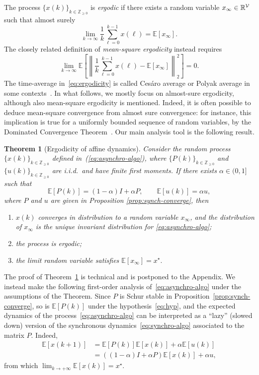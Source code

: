 \documentclass{IEEEtran}
\newtheorem{theorem}{Theorem}
\newcommand{\real}{\mathbb{R}}
\newcommand{\integernonnegative}{\mathbb{Z}_{\ge 0}}
\def\Exp{\mathbb{E}}
\newcommand{\1}{\mathbf{1}} \newcommand{\ind}{\mathds{1}}
\begin{document}
The process $\{x(k)\}_{k\in\integernonnegative}$ is {\em ergodic} if there exists a random variable $x_{\infty} \in \real^\V $ such that almost surely
\begin{equation}\label{eq:ergodicity}
\lim_{k\to \infty}\frac{1}{k}\sum_{\ell=0}^{k-1}x({\ell})=\Exp[x_{\infty}].
\end{equation} 
The closely related definition of {\em{mean-square ergodicity}} instead requires  $$
\lim_{k\to \infty}\Exp\left[\left\|\frac{1}{k}\sum_{\ell=0}^{k-1}x({\ell})-\Exp[x_{\infty}]
\right\|_2^2\right]=0.
$$
The time-average in~\eqref{eq:ergodicity} is called Ces\'aro average or Polyak average in some contexts~\cite{BTP-ABJ:92}.
In what follows, we mostly focus on almost-sure ergodicity, although also mean-square ergodicity is mentioned. Indeed, it is often possible to deduce mean-square convergence from almost sure convergence: for instance, this implication is true for a uniformly bounded sequence of random variables, by the Dominated Convergence Theorem~\cite{VB:95}.
Our main analysis tool is the following result.

\begin{theorem}[Ergodicity of affine dynamics]
\label{thm:ergodic}
Consider the random process $\{x(k)\}_{k\in\integernonnegative}$ defined in~(\ref{eq:asynchro-algo}), where $\{P(k)\}_{k\in\integernonnegative}$ and $\{u(k)\}_{k\in\integernonnegative}$ are i.i.d.\ and have finite first moments. If there exists $\alpha\in(0,1]$ such that 
\begin{equation}\label{eq:hyp}\Exp[P(k)]=(1-\alpha)I+\alpha P,\qquad\Exp[u(k)]=\alpha u,\end{equation} where $P$ and $u$ are given in Proposition \ref{prop:synch-converge}, then
\begin{enumerate}
\item $x(k)$ converges in distribution to a random variable $x_{\infty}$, and the distribution of $x_{\infty}$ is the unique invariant distribution for \eqref{eq:asynchro-algo};
\item the process is {\em ergodic};
\item the limit random variable satisfies
$
\Exp[x_\infty]=x^{\star}.
$ 
\end{enumerate}
\end{theorem}
The proof of Theorem~\ref{thm:ergodic} is technical and is postponed to the Appendix. We instead make the following first-order analysis of~\eqref{eq:asynchro-algo} under the assumptions of the Theorem.
Since $P$ is Schur stable in Proposition~\ref{prop:synch-converge}, so is $\Exp[P(k)]$ under the hypothesis~\eqref{eq:hyp}, and the expected dynamics of the process~\eqref{eq:asynchro-algo} can be interpreted as a ``lazy'' (slowed down) version of the synchronous dynamics~\eqref{eq:synchro-algo} associated to the matrix $P$. Indeed, 
 \begin{align*}
\Exp[x(k+1)]&=\Exp[P(k)]\Exp[x(k)]+\alpha\Exp[u(k)]\\
&=((1-\alpha)I+\alpha P)\Exp[x(k)]+\alpha u,
\end{align*}
from which
$\lim_{k\rightarrow+\infty}\Exp[x(k)]=x^{\star}$. 
\end{document}
